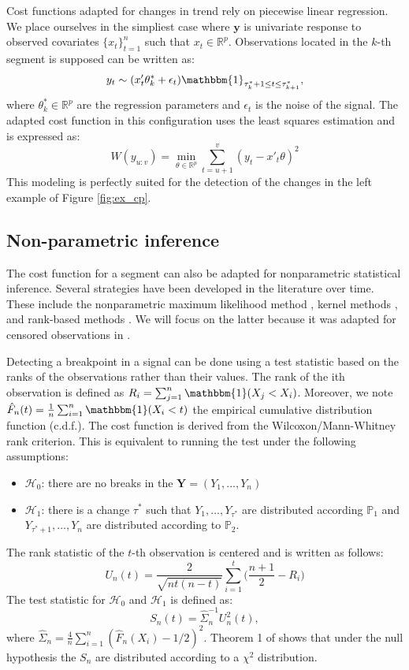 Cost functions adapted for changes in trend rely on piecewise linear regression. We place ourselves in the simpliest case where $\bm y$ is univariate response to observed covariates $\{x_t\}_{t=1}^n$ such that $x_t \in \mathbb{R}^p$. Observations located in the $k$-th segment is supposed can be written as:   
$$y_t \sim (x'_t\theta^*_k + \epsilon_t)\mathbbm{1}_{\tau^*_{k}+1\leq t \leq \tau^*_{k+1}},$$
where $\theta^*_k \in \mathbb{R}^p$ are the regression parameters and $\epsilon_t$ is the noise of the signal. The adapted cost function in this configuration uses the least squares estimation and is expressed as:
$$W(y_{u:v}) = \min_{\theta \in \mathbb{R}^p}\sum_{t=u+1}^v(y_t-x'_t\theta)^2$$ 
This modeling is perfectly suited for the detection of the changes in the left example of Figure \ref{fig:ex_cp}. 

\subsection{Non-parametric inference}

The cost function for a segment can also be adapted for nonparametric statistical inference. Several strategies have been developed in the literature over time. These include the nonparametric maximum likelihood method \cite{Zou2014,Einmahl2003}, kernel methods \cite{Harchaoui2008,li2015m}, and rank-based methods \cite{Pettitt1980,Wang2019}. We will focus on the latter because it was adapted for censored observations in \cite{lung2015}.  

Detecting a breakpoint in a signal can be done using a test statistic based on the ranks of the observations rather than their values. The rank of the ith observation is defined as $R_i = \sum_{j =1}^n\mathbbm{1}(X_j < X_i)$. Moreover, we note $\hat{F}_n(t) = \frac{1}{n}\sum_{i = 1}^n\mathbbm{1}(X_i < t)$ the empirical cumulative distribution function (c.d.f.). The cost function is derived from the Wilcoxon/Mann-Whitney rank criterion. This is equivalent to running the test under the following assumptions: 
\begin{itemize}
  \item $\mathcal{H}_0$: there are no breaks in the $\bm Y = (Y_1,...,Y_n)$ 
  \item $\mathcal{H}_1$: there is a change $\tau^*$ such that $Y_1,...,Y_{\tau^*}$ are distributed according $\mathbb{P}_1$ and $Y_{\tau^*+1},...,Y_{n}$ are distributed according to $\mathbb{P}_2$. 
\end{itemize}
The rank statistic of the $t$-th observation is centered and is written as follows:
\begin{equation}\label{chp2:statranknp}
  U_n(t) = \frac{2}{\sqrt{nt(n-t)}}\sum_{i = 1}^{t}\bigg(\frac{n+1}{2} - R_i\bigg)
\end{equation}
The test statistic for $\mathcal{H}_0$ and $\mathcal{H}_1$ is defined as:
\begin{equation}\label{chp2:stattestnp}
  S_n(t) = \hat{\Sigma}_n^{-1} U^2_n(t),
\end{equation}
where $\hat{\Sigma}_n = \frac{4}{n}\sum_{i=1}^n(\hat{F}_n(X_i)-1/2)^2$. Theorem 1 of \cite{lung2015} shows that under the null hypothesis the $S_n$ are distributed according to a $\chi^2$ distribution.

